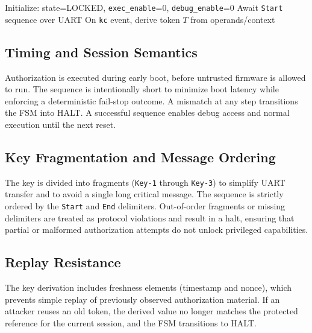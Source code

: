 \begin{algorithm}[H]
  \caption{Authorization sequence and gating}
  Initialize: state=\textsf{LOCKED}, \texttt{exec\_enable}=0, \texttt{debug\_enable}=0\;
  Await \texttt{Start} sequence over UART\;
  On \texttt{kc} event, derive token \(T\) from operands/context\;
\end{algorithm}

\subsection{Timing and Session Semantics}
Authorization is executed during early boot, before untrusted firmware is allowed to run.
The sequence is intentionally short to minimize boot latency while enforcing a deterministic
fail-stop outcome. A mismatch at any step transitions the FSM into \textsf{HALT}. A successful
sequence enables debug access and normal execution until the next reset.

\subsection{Key Fragmentation and Message Ordering}
The key is divided into fragments (\texttt{Key-1} through \texttt{Key-3}) to simplify UART
transfer and to avoid a single long critical message. The sequence is strictly ordered by
the \texttt{Start} and \texttt{End} delimiters. Out-of-order fragments or missing delimiters
are treated as protocol violations and result in a halt, ensuring that partial or malformed
authorization attempts do not unlock privileged capabilities.

\subsection{Replay Resistance}
The key derivation includes freshness elements (timestamp and nonce), which prevents simple
replay of previously observed authorization material. If an attacker reuses an old token,
the derived value no longer matches the protected reference for the current session, and the
FSM transitions to \textsf{HALT}.

